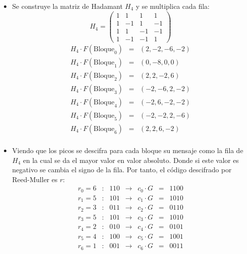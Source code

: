 \begin{itemize}
	\item Se construye la matriz de Hadamant \(H_4\) y se multiplica cada fila:
	\begin{equation}
		H_4=\begin{pmatrix}
			1&1&1&1\\
			1&-1&1&-1\\
			1&1&-1&-1\\
			1&-1&-1&1
		\end{pmatrix}
	\end{equation}
	\begin{equation}
		\begin{array}{ccc}
		H_4\cdot F(\text{Bloque}_0) &=& (2,-2,-6,-2)\\
		H_4\cdot F(\text{Bloque}_1)	&=& (0,-8,0,0)\\
		H_4\cdot F(\text{Bloque}_2)	&=& (2,2,-2,6)\\
		H_4\cdot F(\text{Bloque}_3)	&=& (-2,-6,2,-2)\\
		H_4\cdot F(\text{Bloque}_4)	&=& (-2,6,-2,-2)\\
		H_4\cdot F(\text{Bloque}_5)	&=& (-2,-2,2,-6)\\
		H_4\cdot F(\text{Bloque}_6)	&=& (2,2,6,-2)\\
	\end{array}	
	\end{equation}
	\item Viendo que los picos se descifra para cada bloque su mensaje como la fila de \(H_4\) en la cual se da el mayor valor en valor absoluto. Donde si este valor es negativo se cambia el signo de la fila. Por tanto, el código descifrado por Reed-Muller es \(r\):
	\begin{equation}
		\begin{array}{ccccccc}
			r_0=6&:&110&\rightarrow & c_0 \cdot G&=&1100\\ 
			r_1=5&:&101&\rightarrow & c_1 \cdot G&=&1010\\ 
			r_2=3&:&011&\rightarrow & c_2 \cdot G&=&0110\\ 
			r_3=5&:&101&\rightarrow & c_3 \cdot G&=&1010\\ 
			r_4=2&:&010&\rightarrow & c_4 \cdot G&=&0101\\ 
			r_5=4&:&100&\rightarrow & c_5 \cdot G&=&1001\\ 
			r_6=1&:&001&\rightarrow & c_6 \cdot G&=&0011\\ 
		\end{array}
	\end{equation}
\end{itemize}

